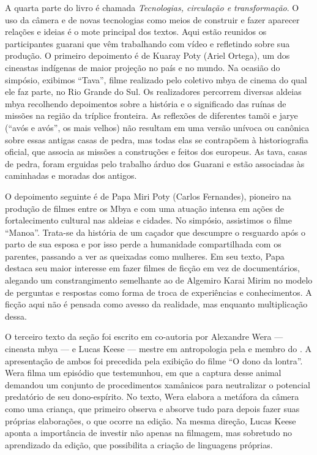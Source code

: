 A quarta parte do livro é chamada \emph{Tecnologias, circulação e
transformação}. O uso da câmera e de novas tecnologias como meios de
construir e fazer aparecer relações e ideias é o mote principal dos
textos. Aqui estão reunidos os participantes guarani que vêm
trabalhando com vídeo e refletindo sobre sua produção. O primeiro
depoimento é de Kuaray Poty (Ariel Ortega), um dos cineastas indígenas
de maior projeção no país e no mundo. Na ocasião do simpósio, exibimos
``Tava'', filme realizado pelo coletivo mbya de cinema do qual ele faz
parte, no Rio Grande do Sul. Os realizadores percorrem diversas aldeias
mbya recolhendo depoimentos sobre a história e o significado das ruínas
de missões na região da tríplice fronteira. As reflexões de diferentes
tamõi e jarye (``avós e avós'', os mais velhos) não resultam em uma
versão unívoca ou canônica sobre essas antigas casas de pedra, mas
todas elas se contrapõem à historiografia oficial, que associa as
missões a construções e feitos dos europeus. As tava, casas de pedra,
foram erguidas pelo trabalho árduo dos Guarani e estão associadas às
caminhadas e moradas dos antigos. 

O depoimento seguinte é de Papa Miri Poty (Carlos
Fernandes), pioneiro na produção de filmes entre os Mbya e com uma
atuação intensa em ações de fortalecimento cultural nas aldeias e
cidades. No simpósio, assistimos o filme ``Manoa''. Trata-se da história
de um caçador que descumpre o resguardo após o parto de sua esposa e
por isso perde a humanidade compartilhada com os parentes, passando a
ver as queixadas como mulheres. Em seu texto, Papa destaca seu maior
interesse em fazer filmes de ficção em vez de documentários, alegando
um constrangimento semelhante ao de Algemiro Karai Mirim no modelo de
perguntas e respostas como forma de troca de experiências e
conhecimentos. A ficção aqui não é pensada como avesso da realidade,
mas enquanto multiplicação dessa. 

O terceiro texto da seção foi escrito em co-autoria por Alexandre Wera —
cineasta mbya — e Lucas Keese — mestre em antropologia pela  e
membro do . A apresentação de ambos foi precedida pela exibição do
filme ``O dono da lontra''. Wera filma um episódio que testemunhou, em
que a captura desse animal demandou um conjunto de procedimentos
xamânicos para neutralizar o potencial predatório de seu dono-espírito.
No texto, Wera elabora a metáfora da câmera como uma criança, que
primeiro observa e absorve tudo para depois fazer suas próprias
elaborações, o que ocorre na edição. Na mesma direção, Lucas Keese
aponta a importância de investir não apenas na filmagem, mas sobretudo
no aprendizado da edição, que possibilita a criação de linguagens
próprias. 

